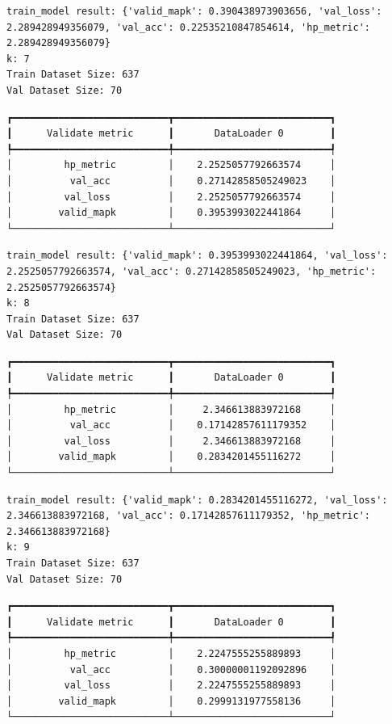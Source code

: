 \documentclass[
  letterpaper,
  DIV=11,
  numbers=noendperiod]{scrreprt}
\begin{document}
\begin{verbatim}
train_model result: {'valid_mapk': 0.390438973903656, 'val_loss': 2.289428949356079, 'val_acc': 0.22535210847854614, 'hp_metric': 2.289428949356079}
k: 7
Train Dataset Size: 637
Val Dataset Size: 70
\end{verbatim}

\begin{verbatim}
┏━━━━━━━━━━━━━━━━━━━━━━━━━━━┳━━━━━━━━━━━━━━━━━━━━━━━━━━━┓
┃      Validate metric      ┃       DataLoader 0        ┃
┡━━━━━━━━━━━━━━━━━━━━━━━━━━━╇━━━━━━━━━━━━━━━━━━━━━━━━━━━┩
│         hp_metric         │    2.2525057792663574     │
│          val_acc          │    0.27142858505249023    │
│         val_loss          │    2.2525057792663574     │
│        valid_mapk         │    0.3953993022441864     │
└───────────────────────────┴───────────────────────────┘
\end{verbatim}

\begin{verbatim}
train_model result: {'valid_mapk': 0.3953993022441864, 'val_loss': 2.2525057792663574, 'val_acc': 0.27142858505249023, 'hp_metric': 2.2525057792663574}
k: 8
Train Dataset Size: 637
Val Dataset Size: 70
\end{verbatim}

\begin{verbatim}
┏━━━━━━━━━━━━━━━━━━━━━━━━━━━┳━━━━━━━━━━━━━━━━━━━━━━━━━━━┓
┃      Validate metric      ┃       DataLoader 0        ┃
┡━━━━━━━━━━━━━━━━━━━━━━━━━━━╇━━━━━━━━━━━━━━━━━━━━━━━━━━━┩
│         hp_metric         │     2.346613883972168     │
│          val_acc          │    0.17142857611179352    │
│         val_loss          │     2.346613883972168     │
│        valid_mapk         │    0.2834201455116272     │
└───────────────────────────┴───────────────────────────┘
\end{verbatim}

\begin{verbatim}
train_model result: {'valid_mapk': 0.2834201455116272, 'val_loss': 2.346613883972168, 'val_acc': 0.17142857611179352, 'hp_metric': 2.346613883972168}
k: 9
Train Dataset Size: 637
Val Dataset Size: 70
\end{verbatim}

\begin{verbatim}
┏━━━━━━━━━━━━━━━━━━━━━━━━━━━┳━━━━━━━━━━━━━━━━━━━━━━━━━━━┓
┃      Validate metric      ┃       DataLoader 0        ┃
┡━━━━━━━━━━━━━━━━━━━━━━━━━━━╇━━━━━━━━━━━━━━━━━━━━━━━━━━━┩
│         hp_metric         │    2.2247555255889893     │
│          val_acc          │    0.30000001192092896    │
│         val_loss          │    2.2247555255889893     │
│        valid_mapk         │    0.2999131977558136     │
└───────────────────────────┴───────────────────────────┘
\end{verbatim}
\end{document}
